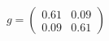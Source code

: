 \documentclass[preview]{standalone}
\begin{document}
\begin{align*}
g = \begin{pmatrix} 0.61 & 0.09 \\ 0.09 & 0.61 \end{pmatrix}
\end{align*}
\end{document}
